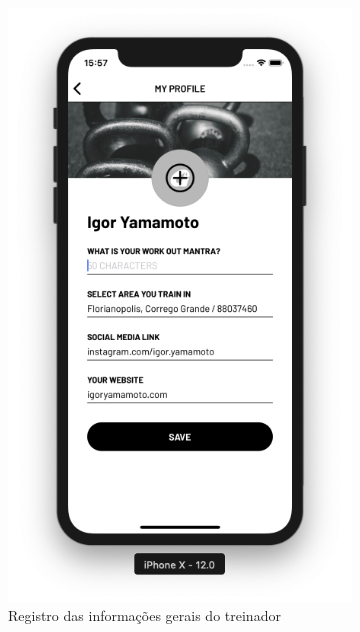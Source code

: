 \begin{figure}[H]
	\centering
    \begin{subfigure}[b]{0.3\textwidth}
        \includegraphics[width=\textwidth]{pfc/figuras/tr-register-profile-1.png}
        \caption{Registro das informações gerais do treinador}
        \label{fig:register-tr-profile-info}
    \end{subfigure}
    ~
	\begin{subfigure}[b]{0.3\textwidth}

\end{subfigure}
\end{figure}
